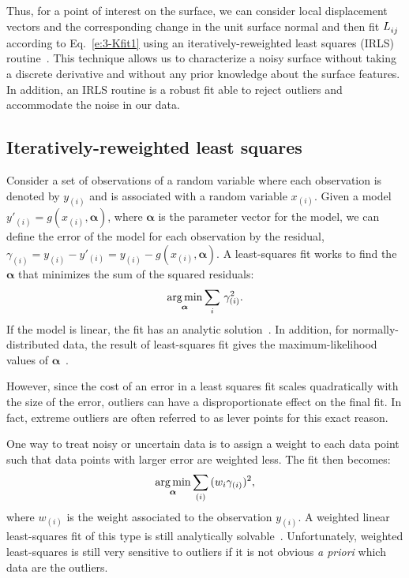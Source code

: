 Thus, for a point of interest on the surface, we can consider local displacement vectors and the corresponding change in the unit surface normal and then fit $\tensor{L}{_{ij}}$ according to Eq.~\ref{e:3-Kfit1} using an iteratively-reweighted least squares (IRLS) routine~\cite{RN32,RN31}.
This technique allows us to characterize a noisy surface without taking a discrete derivative and without any prior knowledge about the surface features.
In addition, an IRLS routine is a robust fit able to reject outliers and accommodate the noise in our data.


\subsection{Iteratively-reweighted least squares}
Consider a set of observations of a random variable where each observation is denoted by $y_{(i)}$ and is associated with a random variable $x_{(i)}$.
Given a model $y'_{(i)} = g(x_{(i)},\bm{\alpha})$, where $\bm{\alpha}$ is the parameter vector for the model, we can define the error of the model for each observation by the residual, $\gamma_{(i)} = y_{(i)} - y'_{(i)} = y_{(i)} - g(x_{(i)},\bm{\alpha})$.
A least-squares fit works to find the $\bm{\alpha}$ that minimizes the sum of the squared residuals:
\begin{equation}
  \operatorname*{arg\,min}_{\bm{\alpha}} \sum\limits_i\,  \gamma_{(i)}^2.\label{e:3-LeastSquare}
\end{equation}
If the model is linear, the fit has an analytic solution~\cite{RN269}.
In addition, for normally-distributed data, the result of least-squares fit gives the maximum-likelihood values of $\bm{\alpha}$~\cite{RN269}.

However, since the cost of an error in a least squares fit scales quadratically with the size of the error, outliers can have a disproportionate effect on the final fit.
In fact, extreme outliers are often referred to as lever points for this exact reason.

One way to treat noisy or uncertain data is to assign a weight to each data point such that data points with larger error are weighted less.
The fit then becomes:
\begin{equation}
  \operatorname*{arg\,min}_{\bm{\alpha}} \sum\limits_{(i)}\, (w_i \gamma_{(i)})^2,
\end{equation}
where $w_{(i)}$ is the weight associated to the observation $y_{(i)}$.
A weighted linear least-squares fit of this type is still analytically solvable~\cite{RN269}.
Unfortunately, weighted least-squares is still very sensitive to outliers if it is not obvious \emph{a priori} which data are the outliers.

